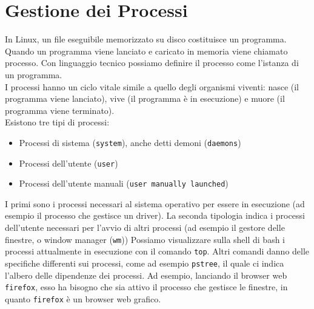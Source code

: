 \documentclass[11pt]{book}
\begin{document}
\section{Gestione dei Processi}
In Linux, un file eseguibile memorizzato su disco costituisce un programma. Quando un programma viene lanciato e caricato in memoria viene chiamato processo. Con linguaggio tecnico possiamo definire il processo come l'istanza di un programma.\\
I processi hanno un ciclo vitale simile a quello degli organismi viventi: nasce (il programma viene lanciato), vive (il programma è in esecuzione) e muore (il programma viene terminato).\\
Esistono tre tipi di processi:
\begin{itemize}
	\item Processi di sistema (\verb"system"), anche detti demoni (\verb"daemons")
	\item Processi dell'utente (\verb"user")
	\item Processi dell'utente manuali (\verb"user manually launched")
\end{itemize}

I primi sono i processi necessari al sistema operativo per essere in esecuzione (ad esempio il processo che gestisce un driver). La seconda tipologia indica i processi dell'utente necessari per l'avvio di altri processi (ad esempio il gestore delle finestre, o window manager (\verb"wm"))
Possiamo visualizzare sulla shell di bash i processi attualmente in esecuzione con il comando \verb"top". Altri comandi danno delle specifiche differenti sui processi, come ad esempio \verb"pstree", il quale ci indica l'albero delle dipendenze dei processi. Ad esempio, lanciando il browser web \verb"firefox", esso ha bisogno che sia attivo il processo che gestisce le finestre, in quanto \verb"firefox" è un browser web grafico. \\
\end{document}
